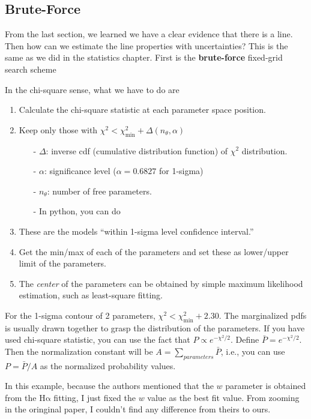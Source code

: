 \subsection{Brute-Force}
From the last section, we learned we have a clear evidence that there is a line. Then how can we estimate the line properties with uncertainties? This is the same as we did in the statistics chapter. First is the \textbf{brute-force} fixed-grid search scheme

In the chi-square sense, what we have to do are
\begin{enumerate}
\item Calculate the chi-square statistic at each parameter space position. 
\item Keep only those with $\chi^2 < \chi^2_\mathrm{min} + \Delta(n_\theta, \alpha)$ 
  \begin{enumerate}
  \item [-] $\Delta$: inverse cdf (cumulative distribution function) of $\chi^2$ distribution.
  \item [-] $\alpha$: significance level ($\alpha = 0.6827$ for 1-sigma)
  \item [-] $ n_\theta $: number of free parameters.
  \item [-] In python, you can do 
  \end{enumerate}
\item These are the models ``within 1-sigma level confidence interval.''
\item Get the min/max of each of the parameters and set these as lower/upper limit of the parameters.
\item The \textit{center} of the parameters can be obtained by simple maximum likelihood estimation, such as least-square fitting.
\end{enumerate}

For the 1-sigma contour of 2 parameters, $ \chi^2 < \chi^2_\mathrm{min} + 2.30 $. The marginalized pdfs is usually drawn together to grasp the distribution of the parameters. If you have used chi-square statistic, you can use the fact that $ P \propto e^{-\chi^2/2} $. Define $ \bar{P} =  e^{-\chi^2/2}$. Then the normalization constant will be $ A = \sum_{parameters} \bar{P} $, i.e., you can use $ P = \bar{P}/A $ as the normalized probability values.

In this example, because the authors mentioned that the $ w $ parameter is obtained from the $ \mathrm{H\alpha} $ fitting, I just fixed the $ w $ value as the best fit value. From zooming in the oringinal paper, I couldn't find any difference from theirs to ours. 

